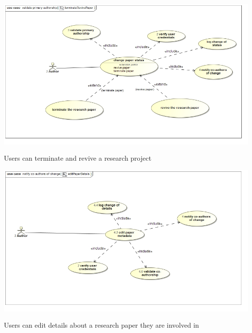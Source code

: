 \documentclass[a4paper,12pt]{report}
\begin{document}
\begin{flushleft}
	\includegraphics[scale=0.5]{./images/uc__validate_primary_authorship__terminateRevivePaper.jpg}
	\begin{center}
		Users can terminate and revive a research project
	\end{center}

	\includegraphics[scale=0.5]{./images/uc__notify_co-authors_of_change__editPaperDetails.jpg}
	\begin{center}
		Users can edit details about a research paper they are involved in
	\end{center}
\end{flushleft}

\newpage
\end{document}
